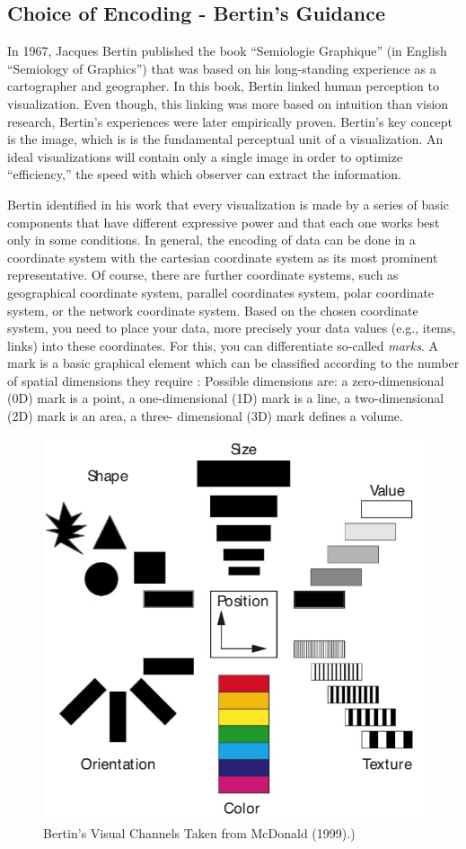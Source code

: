 \documentclass[
]{book}
\begin{document}
\hypertarget{choice-of-encoding---bertins-guidance}{%
\subsection{Choice of Encoding - Bertin's Guidance}\label{choice-of-encoding---bertins-guidance}}

In 1967, Jacques Bertin published the book ``Semiologie Graphique'' (in English ``Semiology of Graphics'') that was based on his long-standing experience as a cartographer and geographer. In this book, Bertin linked human perception to visualization. Even though, this linking was more based on intuition than vision research, Bertin's experiences were later empirically proven. Bertin's key concept is the image, which is is the fundamental perceptual unit of a visualization. An ideal visualizations will contain only a single image in order to optimize ``efficiency,'' the speed with which observer can extract the information.

Bertin identified in his work that every visualization is made by a series of basic components that have different expressive power and that each one works best only in some conditions. In general, the encoding of data can be done in a coordinate system with the cartesian coordinate system as its most prominent representative. Of course, there are further coordinate systems, such as geographical coordinate system, parallel coordinates system, polar coordinate system, or the network coordinate system. Based on the chosen coordinate system, you need to place your data, more precisely your data values (e.g., items, links) into these coordinates. For this, you can differentiate so-called \emph{marks}. A mark is a basic graphical element which can be classified according to the number of spatial dimensions they require \citep{munzner2014visualization}: Possible dimensions are: a zero-dimensional (0D) mark is a point, a one-dimensional (1D) mark is a line, a two-dimensional (2D) mark is an area, a three- dimensional (3D) mark defines a volume.

\begin{figure}

{\centering \includegraphics[width=0.5\linewidth]{images/bertin_visualattributes} 

}

\caption{Bertin’s Visual Channels Taken from McDonald (1999).)}\label{fig:unnamed-chunk-9}
\end{figure}
\end{document}
